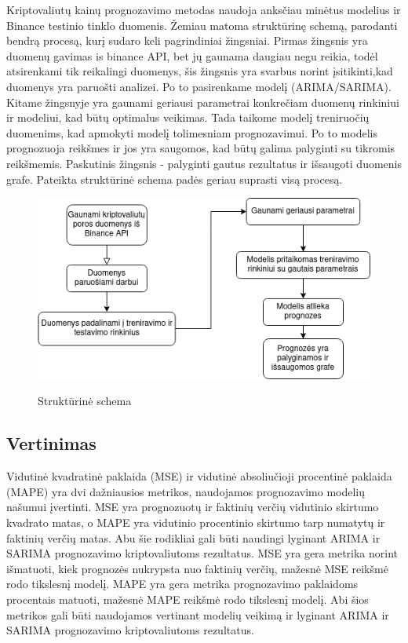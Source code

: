 \documentclass{VUMIFInfKursinis}
\begin{document}
Kriptovaliutų kainų prognozavimo metodas naudoja anksčiau minėtus modelius ir Binance testinio tinklo duomenis. 
Žemiau matoma struktūrinę schemą, parodanti bendrą procesą, kurį sudaro keli pagrindiniai žingsniai. 
Pirmas žingsnis yra duomenų gavimas is binance API, bet jų gaunama daugiau negu reikia, todėl atsirenkami tik reikalingi duomenys, šis žingsnis yra
svarbus norint įsitikinti,kad duomenys yra paruošti analizei. Po to pasirenkame modelį (ARIMA/SARIMA).
Kitame žingsnyje yra gaunami geriausi parametrai konkrečiam duomenų rinkiniui ir modeliui, kad būtų optimalus veikimas. 
Tada taikome modelį treniruočių duomenims, kad apmokyti modelį tolimesniam prognozavimui. 
Po to modelis prognozuoja reikšmes ir jos yra saugomos, kad būtų galima palyginti su tikromis reikšmemis. Paskutinis žingsnis - palyginti gautus rezultatus
ir išsaugoti duomenis grafe. Pateikta struktūrinė schema padės geriau suprasti visą procesą.

\begin{figure}[H]
  \centering
  \includegraphics[width=\textwidth]{img/flowchart.png}
  \label{fig:forecast_flowchart}
  \caption{Struktūrinė schema}
\end{figure}

\subsection{Vertinimas}

Vidutinė kvadratinė paklaida (MSE) ir vidutinė absoliučioji procentinė paklaida (MAPE) yra dvi dažniausios metrikos, naudojamos prognozavimo modelių našumui įvertinti.
MSE yra prognozuotų ir faktinių verčių vidutinio skirtumo kvadrato matas, o MAPE yra vidutinio procentinio skirtumo tarp numatytų ir faktinių verčių matas.
Abu šie rodikliai gali būti naudingi lyginant ARIMA ir SARIMA prognozavimo kriptovaliutoms rezultatus.
MSE yra gera metrika norint išmatuoti, kiek prognozės nukrypsta nuo faktinių verčių, mažesnė MSE reikšmė rodo tikslesnį modelį. 
MAPE yra gera metrika prognozavimo paklaidoms procentais matuoti, mažesnė MAPE reikšmė rodo tikslesnį modelį.
Abi šios metrikos gali būti naudojamos vertinant modelių veikimą ir lyginant ARIMA ir SARIMA prognozavimo kriptovaliutoms rezultatus.
\end{document}
